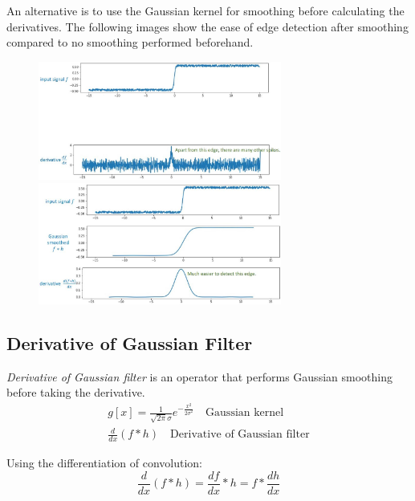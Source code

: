 \documentclass{report}
\begin{document}
An alternative is to use the Gaussian kernel for smoothing before calculating
the derivatives. The following images show the ease of edge detection after
smoothing compared to no smoothing performed beforehand.
\begin{figure}[h]
    \centering
    \includegraphics[width=8cm]{Smoothing 1.JPG}
    \hspace{1cm}
    \includegraphics[width=8cm]{Smooth 2.JPG}
\end{figure}

\subsection{Derivative of Gaussian Filter}

\textit{Derivative of Gaussian filter} is an operator that performs Gaussian
smoothing before taking the derivative. 
\begin{gather*}
    g[x] = \frac{1}{\sqrt{2\pi} \sigma}e^{-\frac{x^2}{2\sigma^2}} \quad \text{Gaussian kernel} \\
    \frac{d}{dx}(f * h) \quad \text{Derivative of Gaussian filter}
\end{gather*}

Using the differentiation of convolution:
$$
    \frac{d}{dx}(f*h) = \frac{df}{dx} * h = f * \frac{dh}{dx} 
$$
\end{document}
